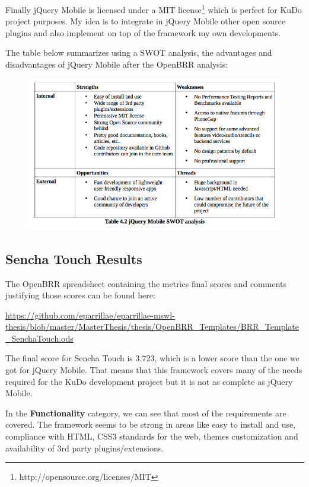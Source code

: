 \documentclass[a4paper,12pt]{book}
\begin{document}
Finally jQuery Mobile is licensed under a MIT license\footnote{http://opensource.org/licenses/MIT} which is perfect for KuDo project purposes. My idea is to integrate in jQuery Mobile other open source plugins and also implement on top of the framework my own developments.

The table below summarizes using a SWOT analysis, the advantages and disadvantages of jQuery Mobile after the OpenBRR analysis:

\begin{figure}[H]
    \centering
    \includegraphics[width=12cm, keepaspectratio]{img/table42.png}
 \end{figure}

\subsection{Sencha Touch Results}
\label{Sencha Touch Results}

The OpenBRR spreadsheet containing the metrics final scores and comments justifying those scores can be found here:

\url{
https://github.com/eparrillae/eparrillae-mswl-thesis/blob/master/MasterThesis/thesis/OpenBRR_Templates/BRR_Template_SenchaTouch.ods}

The final score for Sencha Touch is 3.723, which is a lower score than the one we got for jQuery Mobile. That means that this framework covers many of the needs required for the KuDo development project but it is not as complete as jQuery Mobile.

In the \textbf{Functionality} category, we can see that most of the requirements are covered. The framework seems to be strong in areas like easy to install and use, compliance with HTML, CSS3 standards for the web, themes customization and availability of 3rd party plugins/extensions. 
\end{document}
